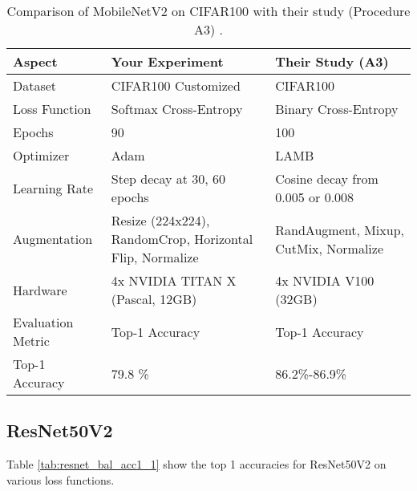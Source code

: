 \begin{table}[H]
    \centering
    \begin{tabular}{lp{5cm}p{5cm}}
        \toprule
        \textbf{Aspect} & \textbf{Your Experiment} & \textbf{Their Study (A3)} \\ 
        \midrule
        Dataset            & CIFAR100 Customized                & CIFAR100                \\
        Loss Function      & Softmax Cross-Entropy   & Binary Cross-Entropy    \\
        Epochs             & 90                      & 100                     \\
        Optimizer          & Adam                    & LAMB                    \\
        Learning Rate      & Step decay at 30, 60 epochs & Cosine decay from 0.005 or 0.008 \\
        Augmentation       & Resize (224x224), RandomCrop, Horizontal Flip, Normalize & RandAugment, Mixup, CutMix, Normalize \\
        Hardware           & 4x NVIDIA TITAN X (Pascal, 12GB) & 4x NVIDIA V100 (32GB) \\
        Evaluation Metric  & Top-1 Accuracy          & Top-1 Accuracy          \\
        Top-1 Accuracy     & 79.8 \% & 86.2\%-86.9\%           \\
        \bottomrule
    \end{tabular}
    \caption{Comparison of MobileNetV2 on CIFAR100 with their study (Procedure A3) \cite{wightman2021resnetstrikesbackimproved}.}
    \label{tab:comparison}
\end{table}


\subsection{ResNet50V2}

Table \ref{tab:resnet_bal_acc1_1} show the top 1 accuracies for ResNet50V2 on various loss functions.

